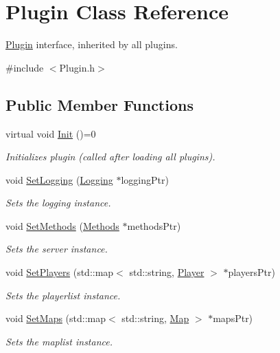 \hypertarget{classPlugin}{\section{Plugin Class Reference}
\label{classPlugin}
}


\hyperlink{classPlugin}{Plugin} interface, inherited by all plugins.  




{\ttfamily \#include $<$Plugin.\-h$>$}

\subsection*{Public Member Functions}
\begin{DoxyCompactItemize}
\item 
\hypertarget{classPlugin_a1409a14522799cb9d1a41fabc40133e5}{virtual void \hyperlink{classPlugin_a1409a14522799cb9d1a41fabc40133e5}{Init} ()=0}\label{classPlugin_a1409a14522799cb9d1a41fabc40133e5}

\begin{DoxyCompactList}\small\item\em Initializes plugin (called after loading all plugins). \end{DoxyCompactList}\item 
void \hyperlink{classPlugin_ae5ceb206ba4ec62f2d8c21b9117ea411}{Set\-Logging} (\hyperlink{classLogging}{Logging} $\ast$logging\-Ptr)
\begin{DoxyCompactList}\small\item\em Sets the logging instance. \end{DoxyCompactList}\item 
void \hyperlink{classPlugin_a86c23967641a554f053148ec072e393a}{Set\-Methods} (\hyperlink{classMethods}{Methods} $\ast$methods\-Ptr)
\begin{DoxyCompactList}\small\item\em Sets the server instance. \end{DoxyCompactList}\item 
void \hyperlink{classPlugin_ae7061592fc0fe1d22a7d2ad4989f78ae}{Set\-Players} (std\-::map$<$ std\-::string, \hyperlink{structPlayer}{Player} $>$ $\ast$players\-Ptr)
\begin{DoxyCompactList}\small\item\em Sets the playerlist instance. \end{DoxyCompactList}\item 
void \hyperlink{classPlugin_a72ace5f9e59a5cba484f4ec30e36e390}{Set\-Maps} (std\-::map$<$ std\-::string, \hyperlink{structMap}{Map} $>$ $\ast$maps\-Ptr)
\begin{DoxyCompactList}\small\item\em Sets the maplist instance. \end{DoxyCompactList}\end{DoxyCompactItemize}
